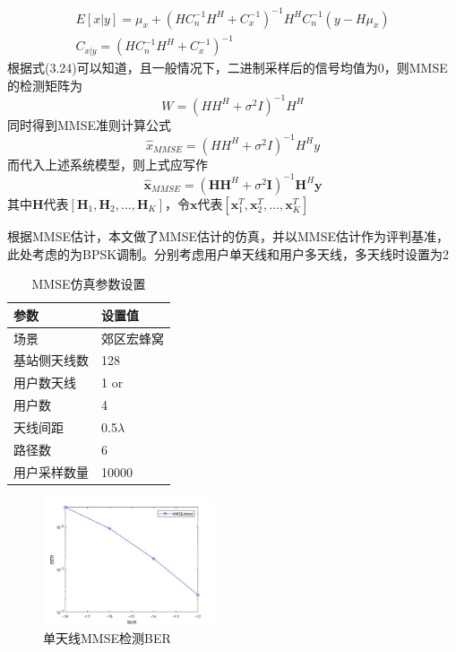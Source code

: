\documentclass[bachelor,nocolorlinks, printoneside]{seuthesis} %
\begin{document}
\begin{Main}
\begin{gather}\label{key}
E[x|y] = \mu_{x} + (HC_n^{-1}H^H + C_x^{-1})^{-1}H^H C_n^{-1}(y-H\mu_{x}) \\ 
C_{x|y} = (H C_n^{-1} H^H + C_x^{-1})^{-1}
\end{gather}
根据式(3.24)可以知道，且一般情况下，二进制采样后的信号均值为0，则MMSE的检测矩阵为
\begin{equation}\label{key}
{W} = ({H}{H}^H + \sigma^2 {I})^{-1}{H}^H
\end{equation}
同时得到MMSE准则计算公式
\begin{equation}\label{key}
\hat{x}_{MMSE} = (HH^H + \sigma^2 I)^{-1}H^H y
\end{equation}
而代入上述系统模型，则上式应写作
\begin{equation}\label{key}
\hat{\mathbf{x}}_{MMSE} = (\mathbf{H}\mathbf{H}^H + \sigma^2 \mathbf{I})^{-1}\mathbf{H}^H \mathbf{y}
\end{equation}
其中$\mathbf{H}$代表$[\mathbf{H}_1,\mathbf{H}_2,...,\mathbf{H}_K]$，令$\mathbf{x}$代表$[\mathbf{x}_1^T,\mathbf{x}_2^T,...,\mathbf{x}_K^T]$


根据MMSE估计，本文做了MMSE估计的仿真，并以MMSE估计作为评判基准，此处考虑的为BPSK调制。分别考虑用户单天线和用户多天线，多天线时设置为2
\begin{table}[htbp]
	\centering
	\caption{\label{tab:test}MMSE仿真参数设置}
	\begin{tabular}{ll}
		\toprule
		参数 &  设置值 \\
		\bottomrule
		场景 &  郊区宏蜂窝 \\
		\bottomrule
		基站侧天线数 & 128 \\
		\bottomrule
		用户数天线	& 1 \quad or\quad2 \\
		\bottomrule
		用户数	& 4 \\
		\bottomrule
		天线间距 & 0.5$\lambda$ \\
		\bottomrule
		路径数 & 6 \\
		\bottomrule
		用户采样数量 & 10000 \\
		\bottomrule
	\end{tabular}
\end{table}

\begin{figure}[htbp!]
	\centering \includegraphics[width=0.45\textwidth]{img/3_1.jpg} \caption{单天线MMSE检测BER}
\end{figure}


\end{Main}
\end{document}
